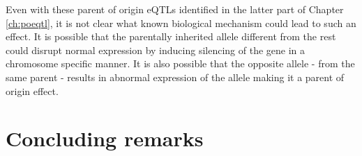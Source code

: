  Even with these parent of origin eQTLs identified in the latter part of Chapter \ref{ch:poeqtl}, it is not clear what known biological mechanism could lead to such an effect. It is possible that the parentally inherited allele different from the rest could disrupt normal expression by inducing silencing of the gene in a chromosome specific manner. It is also possible that the opposite allele - from the same parent - results in abnormal expression of the allele making it a parent of origin effect. 

\section{Concluding remarks}

